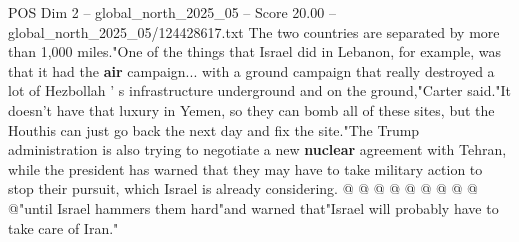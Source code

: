 \begin{textsample}{POS Dim 2 – global\_north\_2025\_05 – Score 20.00 – global\_north\_2025\_05/124428617.txt}
The two countries are separated by more than 1,000 miles."One of the things that Israel did in Lebanon, for example, was that it had the \textbf{air} campaign... with a ground campaign that really destroyed a lot of Hezbollah ' s infrastructure underground and on the ground,"Carter said."It doesn't have that luxury in Yemen, so they can bomb all of these sites, but the Houthis can just go back the next day and fix the site."The Trump administration is also trying to negotiate a new \textbf{nuclear} agreement with Tehran, while the president has warned that they may have to take military action to stop their pursuit, which Israel is already considering. @ @ @ @ @ @ @ @ @ @"until Israel hammers them hard"and warned that"Israel will probably have to take care of Iran."

\end{textsample}
